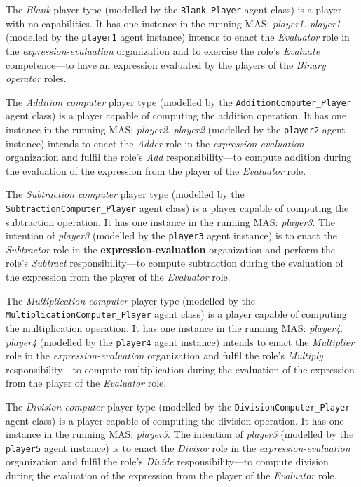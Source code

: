 The \textit{Blank} player type (modelled by the \texttt{Blank\_Player} agent class) is a player with no capabilities.
It has one instance in the running MAS: \textit{player1}.
\textit{player1} (modelled by the \texttt{player1} agent instance) intends to enact the \textit{Evaluator} role in the \textit{expression-evaluation} organization and to exercise the role's \textit{Evaluate} competence---to have an expression evaluated by the players of the \textit{Binary operator} roles.

The \textit{Addition computer} player type (modelled by the \texttt{AdditionComputer\_Player} agent class) is a player capable of computing the addition operation.
It has one instance in the running MAS: \textit{player2}.
\textit{player2} (modelled by the \texttt{player2} agent instance) intends to enact the \textit{Adder} role in the \textit{expression-evaluation} organization and fulfil the role's \textit{Add} responsibility---to compute addition during the evaluation of the expression from the player of the \textit{Evaluator} role.

The \textit{Subtraction computer} player type (modelled by the \texttt{SubtractionComputer\_Player} agent class) is a player capable of computing the subtraction operation.
It has one instance in the running MAS: \textit{player3}.
The intention of \textit{player3} (modelled by the \texttt{player3} agent instance) is to enact the \textit{Subtractor} role in the \textbf{expression-evaluation} organization and perform the role's \textit{Subtract} responsibility---to compute subtraction during the evaluation of the expression from the player of the  \textit{Evaluator} role.

The \textit{Multiplication computer} player type (modelled by the \texttt{MultiplicationComputer\_Player} agent class) is a player capable of computing the multiplication operation.
It has one instance in the running MAS: \textit{player4}.
\textit{player4} (modelled by the \texttt{player4} agent instance) intends to enact the \textit{Multiplier} role in the \textit{expression-evaluation} organization and fulfil the role's \textit{Multiply} responsibility---to compute multiplication during the evaluation of the expression from the player of the \textit{Evaluator} role.

The \textit{Division computer} player type (modelled by the \texttt{DivisionComputer\_Player} agent class) is a player capable of computing the division operation.
It has one instance in the running MAS: \textit{player5}.
The intention of \textit{player5} (modelled by the \texttt{player5} agent instance) is to enact the \textit{Divisor} role in the \textit{expression-evaluation} organization and fulfil the role's \textit{Divide} responsibility---to compute division during the evaluation of the expression from the player of the \textit{Evaluator} role.

